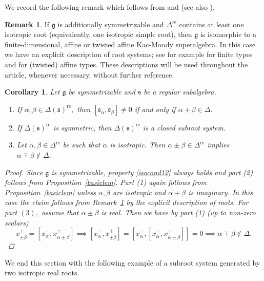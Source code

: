 \documentclass[11pt,reqno]{amsart}
\theoremstyle{plain}
\newtheorem*{cor}{Corollary}%
\theoremstyle{definition}
\newtheorem*{rem}{Remark}
\theoremstyle{remark}
\newcommand{\lie}[1]{\mathfrak{#1}}
\numberwithin{equation}{section}
\begin{document}
We record the following remark which follows from \cite[Theorem 2.27]{hoyt10regular} and \cite[Theorem 5.4]{vander89Classification} (see also \cite[Theorem 7.3]{Serganova11KacMoody}). 
\begin{rem}\label{remafftw}
If $\lie g$ is additionally symmetrizable and $\Delta^{\mathrm{re}}$ contains at least one isotropic root (equivalently, one isotropic simple root), then $\lie g$ is isomorphic to a finite-dimensional, affine or twisted affine Kac-Moody superalgebra. In this case we have an explicit description of root systems; see for example \cite[Section 2.5.4]{kac77liesuper} for finite types and \cite[Table 5]{abbas21affine} for (twisted) affine types. These descriptions will be used throughout the article, whenever necessary, without further reference.
\end{rem}
\begin{cor}\label{finaffine}
Let $\lie{g}$ be symmetrizable and $\lie{s}$ be a regular subalgebra. 
\begin{enumerate}
    \item If $\alpha,\beta\in \Delta(\lie s)^{\mathrm{re}},$ then $[\lie s_\alpha,\lie s_\beta]\neq 0$ if and only if $\alpha+\beta\in \Delta.$
    \item If $\Delta(\lie{s})^{\mathrm{re}}$ is symmetric, then $\Delta(\lie{s})^{\mathrm{re}}$ is a closed subroot system.
    \item Let $\alpha,\beta\in \Delta^{\mathrm{re}}$ be such that $\alpha$ is isotropic. Then $\alpha\pm\beta\in \Delta^{\mathrm{re}}$ implies $\alpha\mp\beta\notin \Delta$.
\end{enumerate}
\begin{proof}
Since $\lie{g}$ is symmetrizable, property \eqref{isocond12} always holds and part (2) follows from Proposition~\ref{basiclem}. Part (1) again follows from Proposition~\ref{basiclem} unless $\alpha,\beta$ are isotropic and $\alpha+\beta$ is imaginary. In this case the claim follows from Remark~\ref{remafftw} by the explicit description of roots. For part $(3),$ assume that $\alpha\pm\beta$ is real. Then we have by part (1) (up to non-zero scalars)
$$x_{\pm \beta}^+=[x_\alpha^-,x_{\alpha\pm\beta}^+] \implies [x_\alpha^-,x_{\pm \beta}^+]=[x_\alpha^-,[x_\alpha^-,x_{\alpha\pm\beta}^+]]=0\implies \alpha\mp\beta\notin \Delta.$$ 
\end{proof}
\end{cor}
We end this section with the following example of a subroot system generated by two isotropic real roots.
\end{document}
